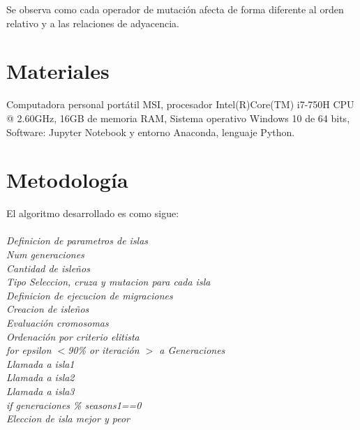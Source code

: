 \documentclass[10pt,letterpaper]{article}
\begin{document}
Se observa como cada operador de mutación afecta de forma diferente al orden relativo y a las relaciones de adyacencia.

\section{Materiales}
Computadora personal portátil MSI, procesador Intel(R)Core(TM) i7-750H CPU @ 2.60GHz, 16GB de memoria RAM, Sistema operativo Windows 10 de 64 bits, Software: Jupyter Notebook y entorno Anaconda, lenguaje Python.

\section{Metodología}
El algoritmo desarrollado es como sigue:
\\\\
\hrulefill \textit{Definicion de parametros de islas} \\
\hspace*{1cm}\textit{Num generaciones}\\
\hspace*{1cm}\textit{Cantidad de isleños}\\
\hspace*{1cm}\textit{Tipo Seleccion, cruza y mutacion para cada isla}\\
\hspace*{1cm}\textit{Definicion de ejecucion de migraciones}\\
\textit{Creacion de isleños}\\
\hspace*{1cm}\textit{Evaluación cromosomas}\\
\hspace*{1cm}\textit{Ordenación por criterio elitista}\\
\textit{for epsilon $<$90\% or iteración $>$ a Generaciones}\\
\hspace*{1cm}\textit{Llamada a isla1}	\\
\hspace*{1cm}\textit{Llamada a isla2}	\\
\hspace*{1cm}\textit{Llamada a isla3}	\\
\hspace*{1cm}\textit{if generaciones \% seasons1==0}\\
\hspace*{2cm}\textit{Eleccion de isla mejor y peor}	\\
\end{document}
